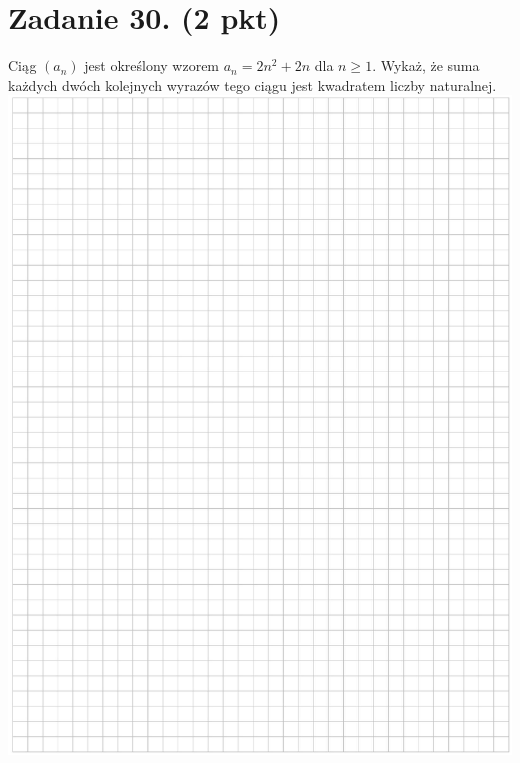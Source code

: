 \documentclass[10pt]{article}
\begin{document}
\section*{Zadanie 30. (2 pkt)}
Ciąg \(\left(a_{n}\right)\) jest określony wzorem \(a_{n}=2 n^{2}+2 n\) dla \(n \geq 1\). Wykaż, że suma każdych dwóch kolejnych wyrazów tego ciągu jest kwadratem liczby naturalnej.\\
\includegraphics[max width=\textwidth, center]{2024_11_21_779b7f825da3a12753feg-16}
\end{document}
